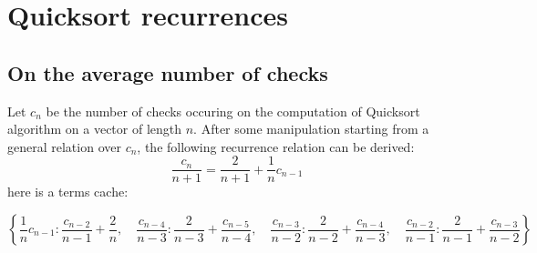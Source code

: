 \documentclass[a4paper,dottedtoc,headinclude,footinclude]{report} %
\theoremstyle{plain}
\begin{document}
    \title{\rmfamily\normalfont{}}
    \author{}
    \date{\today} 
    
    \maketitle
    
    \begin{abstract}
        \noindent In this document we show an implementation of a prototype 
        using the \emph{Python} language, on top of \emph{SymPy} module.
        It allows us to \emph{unfold} recurrence relations, where there
        is \emph{one} free variable. We show some applications to recurrences
        describing average numbers of Quicksort's checks and swaps; moreover, 
        possibly new characterizations for Fibonacci numbers are given.
    \end{abstract}
       
    \tableofcontents
    
    \chapter{Quicksort recurrences}

    \section{On the average number of checks}
    Let $c_{n}$ be the number of checks occuring on the computation
    of Quicksort algorithm on a vector of length $n$. After some manipulation
    starting from a general relation over $c_{n}$, the following
    recurrence relation can be derived:
    \begin{displaymath}
        \frac{c_{n}}{n + 1} = \frac{2}{n + 1} + \frac{1}{n} c_{n - 1}
    \end{displaymath}
    here is a terms cache:
    \begin{center}
    \begin{displaymath}
        \left \{ \frac{1}{n} c_{n - 1} : \frac{c_{n - 2}}{n - 1} + \frac{2}{n}, \quad \frac{c_{n - 4}}{n - 3} : \frac{2}{n - 3} + \frac{c_{n - 5}}{n - 4}, \quad \frac{c_{n - 3}}{n - 2} : \frac{2}{n - 2} + \frac{c_{n - 4}}{n - 3}, \quad \frac{c_{n - 2}}{n - 1} : \frac{2}{n - 1} + \frac{c_{n - 3}}{n - 2}\right \}
    \end{displaymath}
    \end{center}
\end{document}

